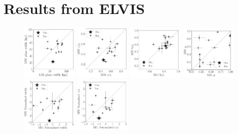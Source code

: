 \documentclass[a4paper,fleqn,usenatbib]{mnras}
\begin{document}
\section{Results from ELVIS}
\begin{figure}
\centering
\includegraphics[width=0.24\textwidth]{scatter_ranked_elvis_width.pdf}
\includegraphics[width=0.24\textwidth]{scatter_ranked_elvis_ca_ratio.pdf}
\includegraphics[width=0.24\textwidth]{scatter_ranked_elvis_ba_ratio.pdf}
\includegraphics[width=0.24\textwidth]{scatter_ranked_elvis_mu.pdf}
\includegraphics[width=0.24\textwidth]{scatter_norm_ranked_elvis_width.pdf}
\includegraphics[width=0.24\textwidth]{scatter_norm_ranked_elvis_ca_ratio.pdf}

\end{figure}
\end{document}
